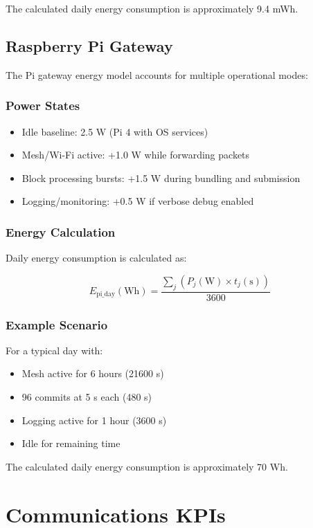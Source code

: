 \documentclass[12pt]{article}
\begin{document}
The calculated daily energy consumption is approximately 9.4 mWh.

\subsection{Raspberry Pi Gateway}

The Pi gateway energy model accounts for multiple operational modes:

\subsubsection{Power States}
\begin{itemize}
    \item Idle baseline: 2.5 W (Pi 4 with OS services)
    \item Mesh/Wi-Fi active: +1.0 W while forwarding packets
    \item Block processing bursts: +1.5 W during bundling and submission
    \item Logging/monitoring: +0.5 W if verbose debug enabled
\end{itemize}

\subsubsection{Energy Calculation}
Daily energy consumption is calculated as:

\begin{equation}
E_{\text{pi\_day}} (\text{Wh}) = \frac{\sum_j (P_j (\text{W}) \times t_j (\text{s}))}{3600}
\end{equation}

\subsubsection{Example Scenario}
For a typical day with:
\begin{itemize}
    \item Mesh active for 6 hours (21600 s)
    \item 96 commits at 5 s each (480 s)
    \item Logging active for 1 hour (3600 s)
    \item Idle for remaining time
\end{itemize}

The calculated daily energy consumption is approximately 70 Wh.

\section{Communications KPIs}
\label{sec:kpis}
\end{document}
